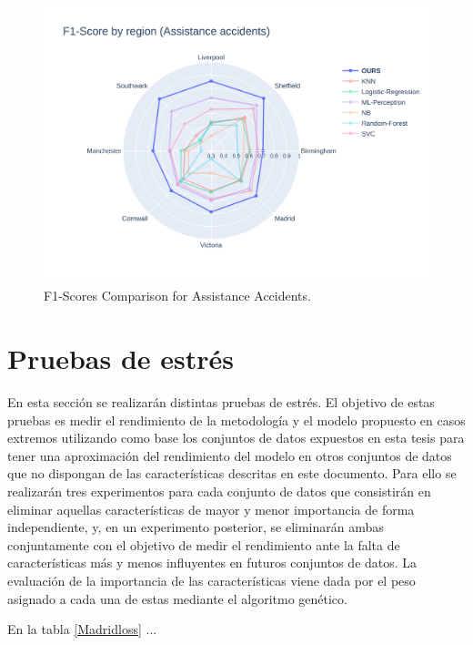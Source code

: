 \documentclass{uathesis-es}
\begin{document}
\begin{figure}[H]
    \centering
    \includegraphics[width=150mm]{Figures/Assistance.png}
    \caption{F1-Scores Comparison for Assistance Accidents.}
    \label{GlobalAssistanceF1Score}
\end{figure}

\section{Pruebas de estrés}

En esta sección se realizarán distintas pruebas de estrés. El objetivo de estas pruebas es medir el rendimiento de la metodología y el modelo propuesto en casos extremos utilizando como base los conjuntos de datos expuestos en esta tesis para tener una aproximación del rendimiento del modelo en otros conjuntos de datos que no dispongan de las características descritas en este documento. Para ello se realizarán tres experimentos para cada conjunto de datos que consistirán en eliminar aquellas características de mayor y menor importancia de forma independiente, y, en un experimento posterior, se eliminarán ambas conjuntamente con el objetivo de medir el rendimiento ante la falta de características más y menos influyentes en futuros conjuntos de datos. La evaluación de la importancia de las características viene dada por el peso asignado a cada una de estas mediante el algoritmo genético.

En la tabla \ref{Madridloss} ...
\end{document}
